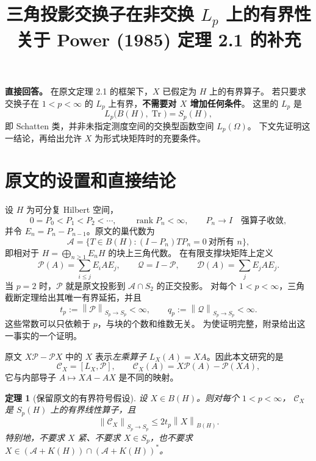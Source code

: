 \documentclass[UTF8,11pt,a4paper,fontset=fandol]{ctexart}
\title{三角投影交换子在非交换 $L_p$ 上的有界性\\
\large 关于 Power (1985) 定理 2.1 的补充}
\author{}
\date{}
\newtheorem{theorem}{定理}[section]
\theoremstyle{remark}
\newcommand{\BH}{B(H)}
\newcommand{\Tr}{\operatorname{Tr}}
\newcommand{\PP}{\mathcal P}
\newcommand{\QQ}{\mathcal Q}
\newcommand{\DD}{\mathcal D}
\newcommand{\Alg}{\mathcal A}
\newcommand{\CC}{\mathcal C}
\newcommand{\norm}[1]{\left\lVert #1\right\rVert}
\DeclareMathOperator{\rank}{rank}
\begin{document}
\maketitle
\vspace{-2em}

\noindent\textbf{直接回答。}
在原文定理 2.1 的框架下，$X$ 已假定为 $H$ 上的有界算子。
若只要求交换子在 $1<p<\infty$ 的 $L_p$ 上有界，\textbf{不需要对 $X$ 增加任何条件}。
这里的 $L_p$ 是
\[
 L_p\bigl(B(H),\Tr\bigr)=S_p(H),
\]
即 Schatten 类，并非未指定测度空间的交换型函数空间 $L_p(\Omega)$。
下文先证明这一结论，再给出允许 $X$ 为形式块矩阵时的充要条件。

\section{原文的设置和直接结论}

设 $H$ 为可分复 Hilbert 空间，
\[
 0=P_0<P_1<P_2<\cdots,\qquad \rank P_n<\infty,
 \qquad P_n\longrightarrow I\quad\text{强算子收敛},
\]
并令 $E_n=P_n-P_{n-1}$。原文的巢代数为
\[
 \Alg=\{T\in\BH:(I-P_n)TP_n=0\ \text{对所有 }n\},
\]
即相对于 $H=\bigoplus_{n\geq1}E_nH$ 的块上三角代数。
在有限支撑块矩阵上定义
\[
 \PP(A)=\sum_{i\leq j}E_iAE_j,\qquad
 \QQ=I-\PP,\qquad
 \DD(A)=\sum_jE_jAE_j.
\]
当 $p=2$ 时，$\PP$ 就是原文投影到 $\Alg\cap S_2$ 的正交投影。
对每个 $1<p<\infty$，三角截断定理给出其唯一有界延拓，并且
\begin{equation}\label{eq:tp}
 t_p:=\norm{\PP}_{S_p\to S_p}<\infty,\qquad
 q_p:=\norm{\QQ}_{S_p\to S_p}<\infty.
\end{equation}
这些常数可以只依赖于 $p$，与块的个数和维数无关。
为使证明完整，附录给出这一事实的一个证明。

\medskip
原文 $X\PP-\PP X$ 中的 $X$ 表示\emph{左乘算子}
$L_X(A)=XA$。因此本文研究的是
\begin{equation}\label{eq:defC}
 \CC_X=[L_X,\PP],\qquad
 \CC_X(A)=X\PP(A)-\PP(XA),
\end{equation}
它与内部导子 $A\mapsto XA-AX$ 是不同的映射。

\begin{theorem}[保留原文的有界符号假设]\label{thm:bounded}
设 $X\in\BH$。则对每个 $1<p<\infty$，
$\CC_X$ 是 $S_p(H)$ 上的有界线性算子，且
\begin{equation}\label{eq:easybound}
 \norm{\CC_X}_{S_p\to S_p}\leq 2t_p\norm{X}_{\BH}.
\end{equation}
特别地，不要求 $X$ 紧、不要求 $X\in S_p$，也不要求
$X\in(\Alg+K(H))\cap(\Alg+K(H))^*$。
\end{theorem}
\end{document}
